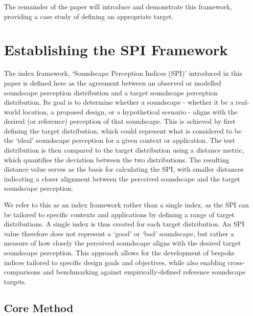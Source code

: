 \documentclass[
  authoryear,
  3p]{elsarticle}
\begin{document}
The remainder of the paper will introduce and demonstrate this
framework, providing a case study of defining an appropriate target.

\section{Establishing the SPI Framework}\label{sec-method}

The index framework, `Soundscape Perception Indices (SPI)' introduced in
this paper is defined here as the agreement between an observed or
modelled soundscape perception distribution and a target soundscape
perception distribution. Its goal is to determine whether a soundscape -
whether it be a real-world location, a proposed design, or a
hypothetical scenario - aligns with the desired (or reference)
perception of that soundscape. This is achieved by first defining the
target distribution, which could represent what is considered to be the
`ideal' soundscape perception for a given context or application. The
test distribution is then compared to the target distribution using a
distance metric, which quantifies the deviation between the two
distributions. The resulting distance value serves as the basis for
calculating the SPI, with smaller distances indicating a closer
alignment between the perceived soundscape and the target soundscape
perception.

We refer to this as an index framework rather than a single index, as
the SPI can be tailored to specific contexts and applications by
defining a range of target distributions. A single index is thus created
for each target distribution. An SPI value therefore does not represent
a `good' or `bad' soundscape, but rather a measure of how closely the
perceived soundscape aligns with the desired target soundscape
perception. This approach allows for the development of bespoke indices
tailored to specific design goals and objectives, while also enabling
cross-comparisons and benchmarking against empirically-defined reference
soundscape targets.

\subsection{Core Method}\label{sec-core-method}
\end{document}
